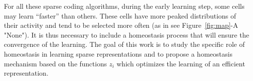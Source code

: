 \documentclass[vision,article,submit,oneauthor,pdftex]{Definitions/mdpi}
\begin{document}
For all these sparse coding algorithms, during the early learning step, some cells may learn ``faster'' than others. These cells have more peaked distributions of their activity and tend to be selected more often (as in see Figure~\ref{fig:map}-A "None"). It is thus necessary to include a homeostasis process that will ensure the convergence of the learning. The goal of this work is to study the specific role of homeostasis in learning sparse representations and to propose a homeostasis mechanism based on the functions $z_i$ which optimizes the learning of an efficient representation.%
\end{document}
